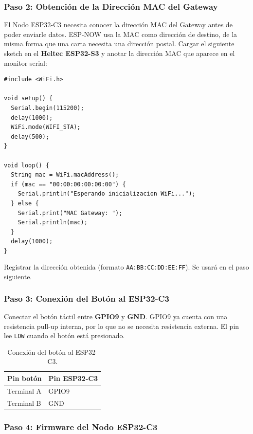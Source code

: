 \documentclass[12pt,leqno]{article}
\begin{document}
\subsubsection*{Paso 2: Obtenci\'on de la Direcci\'on MAC del Gateway}

El Nodo ESP32-C3 necesita conocer la direcci\'on MAC del Gateway antes de poder
enviarle datos. ESP-NOW usa la MAC como direcci\'on de destino, de la misma forma
que una carta necesita una direcci\'on postal. Cargar el siguiente sketch en el
\textbf{Heltec ESP32-S3} y anotar la direcci\'on MAC que aparece en el monitor
serial:

\begin{lstlisting}
#include <WiFi.h>

void setup() {
  Serial.begin(115200);
  delay(1000);
  WiFi.mode(WIFI_STA);
  delay(500);
}

void loop() {
  String mac = WiFi.macAddress();
  if (mac == "00:00:00:00:00:00") {
    Serial.println("Esperando inicializacion WiFi...");
  } else {
    Serial.print("MAC Gateway: ");
    Serial.println(mac);
  }
  delay(1000);
}
\end{lstlisting}

\noindent Registrar la direcci\'on obtenida (formato \texttt{AA:BB:CC:DD:EE:FF}).
Se usar\'a en el paso siguiente.

\subsubsection*{Paso 3: Conexi\'on del Bot\'on al ESP32-C3}

Conectar el bot\'on t\'actil entre \textbf{GPIO9} y \textbf{GND}. GPIO9 ya cuenta
con una resistencia pull-up interna, por lo que no se necesita resistencia externa.
El pin lee \texttt{LOW} cuando el bot\'on est\'a presionado.

\begin{table}[h]
\centering
\begin{tabular}{|p{4cm}|p{4cm}|}
\hline
\textbf{Pin bot\'on} & \textbf{Pin ESP32-C3} \\
\hline
Terminal A & GPIO9 \\
\hline
Terminal B & GND \\
\hline
\end{tabular}
\caption{Conexi\'on del bot\'on al ESP32-C3.}
\end{table}

\pagebreak
\subsubsection*{Paso 4: Firmware del Nodo ESP32-C3}
\end{document}
